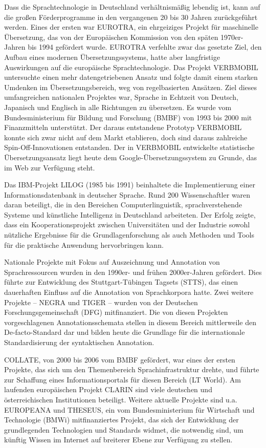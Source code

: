 \documentclass[]{../../metanetpaper}
\begin{document}
\begin{multicols}{2}
Dass die Sprachtechnologie in Deutschland verhältnismäßig lebendig ist, kann auf die großen Förderprogramme in den vergangenen 20 bis 30 Jahren zurückgeführt werden. Eines der ersten war EUROTRA, ein ehrgeiziges Projekt für maschinelle Übersetzung, das von der Europäischen Kommission von den späten 1970er-Jahren bis 1994 gefördert wurde. EUROTRA verfehlte zwar das gesetzte Ziel, den Aufbau eines modernen Übersetzungssystems, hatte aber langfristige Auswirkungen auf die europäische Sprachtechnologie. Das Projekt VERBMOBIL untersuchte einen mehr datengetriebenen Ansatz und folgte damit einem starken Umdenken im Übersetzungsbereich, weg von regelbasierten Ansätzen. Ziel dieses umfangreichen nationalen Projektes war, Sprache in Echtzeit von Deutsch, Japanisch und Englisch in alle Richtungen zu übersetzen. Es wurde vom Bundesministerium für Bildung und Forschung (BMBF) von 1993 bis 2000 mit Finanzmitteln unterstützt. Der daraus entstandene Prototyp VERBMOBIL konnte sich zwar nicht auf dem Markt etablieren, doch sind daraus zahlreiche Spin-Off-Innovationen entstanden. Der in VERBMOBIL entwickelte statistische Übersetzungsansatz liegt heute dem Google-Übersetzungssystem zu Grunde, das im Web zur Verfügung steht. 

Das IBM-Projekt LILOG (1985 bis 1991) beinhaltete die Implementierung einer Informationsdatenbank in deutscher Sprache. Rund 200 Wissenschaftler waren daran beteiligt, die in den Bereichen Computerlinguistik, sprachverstehende Systeme und künstliche Intelligenz in Deutschland arbeiteten. Der Erfolg zeigte, dass ein Kooperationsprojekt zwischen Universitäten und der Industrie sowohl nützliche Ergebnisse für die Grundlagenforschung als auch Methoden und Tools für die praktische Anwendung hervorbringen kann.

Nationale Projekte mit Fokus auf Auszeichnung und Annotation von Sprachressourcen wurden in den 1990er- und frühen 2000er-Jahren gefördert. Dies führte zur Entwicklung des Stuttgart-Tübingen Tagsets (STTS), das einen dauerhaften Einfluss auf die Annotation von Sprachkorpora hatte. Zwei weitere Projekte – NEGRA und TIGER – wurden von der Deutschen Forschungsgemeinschaft (DFG) mitfinanziert. Die von diesen Projekten vorgeschlagenen Annotationsschemata stellen in diesem Bereich mittlerweile den De-facto-Standard dar und bilden heute die Grundlage für die internationale Standardisierung der syntaktischen Annotation.

COLLATE, von 2000 bis 2006 vom BMBF gefördert, war eines der ersten Projekte, das sich um den Themenbereich Sprachinfrastruktur drehte, und führte zur Schaffung eines Informationsportals für diesen Bereich (LT World). Am laufenden europäischen Projekt CLARIN sind viele deutschen und österreichischen Institutionen beteiligt. Weitere aktuelle Projekte sind u.a. EUROPEANA und THESEUS, ein vom Bundesministerium für Wirtschaft und Technologie (BMWi) mitfinanziertes Projekt, das sich der Entwicklung der grundlegenden Technologien und Standards widmet, die notwendig sind, um künftig Wissen im Internet auf breiterer Ebene zur Verfügung zu stellen. 


\end{multicols}
\end{document}
